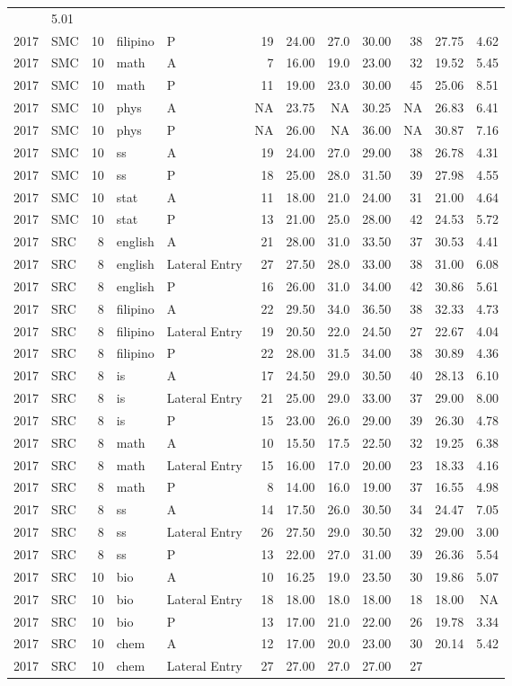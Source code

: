 \documentclass[]{article}
\begin{document}
\begin{longtable}[]{@{}rlrllrrrrrrr@{}}
& 5.01\tabularnewline
2017 & SMC & 10 & filipino & P & 19 & 24.00 & 27.0 & 30.00 & 38 & 27.75
& 4.62\tabularnewline
2017 & SMC & 10 & math & A & 7 & 16.00 & 19.0 & 23.00 & 32 & 19.52 &
5.45\tabularnewline
2017 & SMC & 10 & math & P & 11 & 19.00 & 23.0 & 30.00 & 45 & 25.06 &
8.51\tabularnewline
2017 & SMC & 10 & phys & A & NA & 23.75 & NA & 30.25 & NA & 26.83 &
6.41\tabularnewline
2017 & SMC & 10 & phys & P & NA & 26.00 & NA & 36.00 & NA & 30.87 &
7.16\tabularnewline
2017 & SMC & 10 & ss & A & 19 & 24.00 & 27.0 & 29.00 & 38 & 26.78 &
4.31\tabularnewline
2017 & SMC & 10 & ss & P & 18 & 25.00 & 28.0 & 31.50 & 39 & 27.98 &
4.55\tabularnewline
2017 & SMC & 10 & stat & A & 11 & 18.00 & 21.0 & 24.00 & 31 & 21.00 &
4.64\tabularnewline
2017 & SMC & 10 & stat & P & 13 & 21.00 & 25.0 & 28.00 & 42 & 24.53 &
5.72\tabularnewline
2017 & SRC & 8 & english & A & 21 & 28.00 & 31.0 & 33.50 & 37 & 30.53 &
4.41\tabularnewline
2017 & SRC & 8 & english & Lateral Entry & 27 & 27.50 & 28.0 & 33.00 &
38 & 31.00 & 6.08\tabularnewline
2017 & SRC & 8 & english & P & 16 & 26.00 & 31.0 & 34.00 & 42 & 30.86 &
5.61\tabularnewline
2017 & SRC & 8 & filipino & A & 22 & 29.50 & 34.0 & 36.50 & 38 & 32.33 &
4.73\tabularnewline
2017 & SRC & 8 & filipino & Lateral Entry & 19 & 20.50 & 22.0 & 24.50 &
27 & 22.67 & 4.04\tabularnewline
2017 & SRC & 8 & filipino & P & 22 & 28.00 & 31.5 & 34.00 & 38 & 30.89 &
4.36\tabularnewline
2017 & SRC & 8 & is & A & 17 & 24.50 & 29.0 & 30.50 & 40 & 28.13 &
6.10\tabularnewline
2017 & SRC & 8 & is & Lateral Entry & 21 & 25.00 & 29.0 & 33.00 & 37 &
29.00 & 8.00\tabularnewline
2017 & SRC & 8 & is & P & 15 & 23.00 & 26.0 & 29.00 & 39 & 26.30 &
4.78\tabularnewline
2017 & SRC & 8 & math & A & 10 & 15.50 & 17.5 & 22.50 & 32 & 19.25 &
6.38\tabularnewline
2017 & SRC & 8 & math & Lateral Entry & 15 & 16.00 & 17.0 & 20.00 & 23 &
18.33 & 4.16\tabularnewline
2017 & SRC & 8 & math & P & 8 & 14.00 & 16.0 & 19.00 & 37 & 16.55 &
4.98\tabularnewline
2017 & SRC & 8 & ss & A & 14 & 17.50 & 26.0 & 30.50 & 34 & 24.47 &
7.05\tabularnewline
2017 & SRC & 8 & ss & Lateral Entry & 26 & 27.50 & 29.0 & 30.50 & 32 &
29.00 & 3.00\tabularnewline
2017 & SRC & 8 & ss & P & 13 & 22.00 & 27.0 & 31.00 & 39 & 26.36 &
5.54\tabularnewline
2017 & SRC & 10 & bio & A & 10 & 16.25 & 19.0 & 23.50 & 30 & 19.86 &
5.07\tabularnewline
2017 & SRC & 10 & bio & Lateral Entry & 18 & 18.00 & 18.0 & 18.00 & 18 &
18.00 & NA\tabularnewline
2017 & SRC & 10 & bio & P & 13 & 17.00 & 21.0 & 22.00 & 26 & 19.78 &
3.34\tabularnewline
2017 & SRC & 10 & chem & A & 12 & 17.00 & 20.0 & 23.00 & 30 & 20.14 &
5.42\tabularnewline
2017 & SRC & 10 & chem & Lateral Entry & 27 & 27.00 & 27.0 & 27.00 & 27

\end{longtable}
\end{document}
